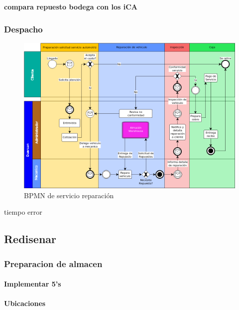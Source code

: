 \documentclass[
]{article}
\begin{document}
\textbf{compara repuesto bodega con los iCA}

\hypertarget{despacho}{%
\subsubsection{Despacho}\label{despacho}}

\begin{figure}[H]

{\centering \includegraphics[width=0.5\linewidth]{marco teorico/D_servicio} 

}

\caption{BPMN de servicio reparación}\label{fig:unnamed-chunk-13}
\end{figure}

tiempo error

\hypertarget{redisenar}{%
\subsection{Redisenar}\label{redisenar}}

\hypertarget{preparacion-de-almacen}{%
\subsubsection{Preparacion de almacen}\label{preparacion-de-almacen}}

\hypertarget{implementar-5s}{%
\paragraph{Implementar 5's}\label{implementar-5s}}

\hypertarget{section}{%
\paragraph{}\label{section}}

\hypertarget{ubicaciones}{%
\paragraph{Ubicaciones}\label{ubicaciones}}
\end{document}
